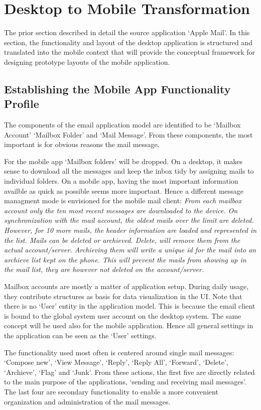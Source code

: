 \documentclass[a4paper,11pt,twoside]{article}
\begin{document}
\section{Desktop to Mobile Transformation}
The prior section described in detail the source application `Apple Mail'. In this
section, the functionality and layout of the desktop application is structured
and translated into the mobile context that will provide the conceptual framework
for designing prototype layouts of the mobile application.

\subsection{Establishing the Mobile App Functionality Profile}
The components of the email application model are identified to be `Mailbox Account'
`Mailbox Folder' and `Mail Message'. From these components, the most important is for
obvious reasons the mail message.

For the mobile app `Mailbox folders' will be dropped. On a desktop, it makes
sense to download all the messages and keep the inbox tidy by assigning mails to
individual folders. On a mobile app, having the most important information
availble as quick as possible seems more important. Hence a different message
managment mode is envisioned for the mobile mail client: \textit{From each
mailbox account only the ten most recent messages are downloaded to the device.
On synchronization with the mail account, the oldest mails over the limit are
deleted. However, for 10 more mails, the header information are loaded and
represented in the list. Mails can be deleted or archieved. Delete, will remove
them from the actual account/server. Archieving them will write a unique id for
the mail into an archieve list kept on the phone. This will prevent the mails
from showing up in the mail list, they are however not deleted on the
account/server.}

Mailbox accounts are mostly a matter of application setup. During daily usage,
they contribute structures as basis for data visualization in the UI. Note that
there is no `User' entity in the application model. This is because the email
client is bound to the global system user account on the desktop system. The
same concept will be used also for the mobile application. Hence all general
settings in the application can be seen as the `User' settings.

The functionality used most often is centered around single mail messages:
`Compose new', `View Message', `Reply', `Reply All', `Forward', `Delete',
`Archieve', `Flag' and `Junk'. From these actions, the first five are directly
related to the main purpose of the applications, `sending and receiving mail
messages'. The last four are secondary functionality to enable a more convenient
organization and administration of the mail messages.
\end{document}
